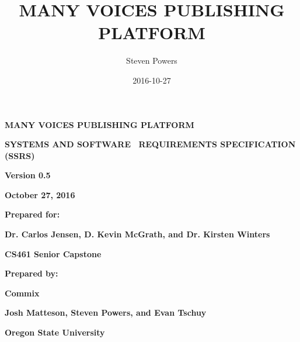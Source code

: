 \documentclass[letterpaper, 10pt, draftclsnofoot, compsoc, onecolumn]{IEEEtran}
\title{MANY VOICES PUBLISHING PLATFORM}
\author{Steven Powers}
\date{2016-10-27}
\begin{document}
\clearpage\setcounter{page}{1}\pagestyle{Standard}
\thispagestyle{FirstPage}


\bigskip


\bigskip

\clearpage

{\centering{}\bfseries\color{black}\huge
MANY VOICES PUBLISHING PLATFORM
\par}


\bigskip

\bigskip


{\centering{}\bfseries\color{black}\Large
SYSTEMS AND SOFTWARE \ REQUIREMENTS SPECIFICATION (SSRS)
\par}


\bigskip


\bigskip


\bigskip


\bigskip


\bigskip

{\centering{}\bfseries\color{black}
Version 0.5
\par}

{\centering{}\bfseries\color{black}
October 27, 2016
\par}


\bigskip


\bigskip

{\centering{}\bfseries\color{black}
Prepared for:
\par}

{\centering{}\bfseries\color{black}
Dr. Carlos Jensen, D. Kevin McGrath, and Dr. Kirsten Winters
\par}

{\centering{}\bfseries\color{black}
CS461 Senior Capstone
\par}


\bigskip


\bigskip

{\centering{}\bfseries\color{black}
Prepared by:
\par}

{\centering{}\bfseries\color{black}
Commix
\par}

{\centering{}\bfseries\color{black}
Josh Matteson, Steven Powers, and Evan Tschuy
\par}

{\centering{}\bfseries\color{black}
Oregon State University
\par}
\end{document}
